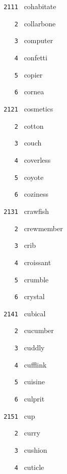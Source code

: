 \documentclass[11pt]{article}
\begin{document}
\begin{multicols}{6}
\footnotesize
\noindent \texttt{ 2111 } cohabitate  \par
\noindent \texttt{ \ \ \ 2 } collarbone  \par
\noindent \texttt{ \ \ \ 3 } computer  \par
\noindent \texttt{ \ \ \ 4 } confetti  \par
\noindent \texttt{ \ \ \ 5 } copier  \par
\noindent \texttt{ \ \ \ 6 } cornea  \par
\vspace{3mm}
\noindent \texttt{ 2121 } cosmetics  \par
\noindent \texttt{ \ \ \ 2 } cotton  \par
\noindent \texttt{ \ \ \ 3 } couch  \par
\noindent \texttt{ \ \ \ 4 } coverless  \par
\noindent \texttt{ \ \ \ 5 } coyote  \par
\noindent \texttt{ \ \ \ 6 } coziness  \par
\vspace{3mm}
\noindent \texttt{ 2131 } crawfish  \par
\noindent \texttt{ \ \ \ 2 } crewmember  \par
\noindent \texttt{ \ \ \ 3 } crib  \par
\noindent \texttt{ \ \ \ 4 } croissant  \par
\noindent \texttt{ \ \ \ 5 } crumble  \par
\noindent \texttt{ \ \ \ 6 } crystal  \par
\vspace{3mm}
\noindent \texttt{ 2141 } cubical  \par
\noindent \texttt{ \ \ \ 2 } cucumber  \par
\noindent \texttt{ \ \ \ 3 } cuddly  \par
\noindent \texttt{ \ \ \ 4 } cufflink  \par
\noindent \texttt{ \ \ \ 5 } cuisine  \par
\noindent \texttt{ \ \ \ 6 } culprit  \par
\vspace{3mm}
\noindent \texttt{ 2151 } cup  \par
\noindent \texttt{ \ \ \ 2 } curry  \par
\noindent \texttt{ \ \ \ 3 } cushion  \par
\noindent \texttt{ \ \ \ 4 } cuticle  \par

\end{multicols}
\end{document}
